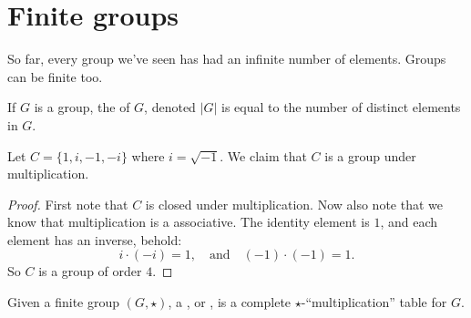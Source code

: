 \documentclass{ximera}
\begin{document}
\section{Finite groups}


So far, every group we've seen has had an infinite number of
elements. Groups can be finite too.

\begin{definition}
  If $G$ is a group, the  of $G$, denoted $|G|$ is equal to
  the number of distinct elements in $G$.
\end{definition}


\begin{example}\label{E:C}
  Let $C = \{1,i,-1,-i\}$ where $i =\sqrt{-1}$. We claim that $C$ is a
  group under multiplication.
  \begin{proof}
    First note that $C$ is closed under multiplication. Now also note
    that we know that multiplication is a associative. The identity
    element is $1$, and each element has an inverse, behold:
    \[
    i\cdot (-i) = 1, \quad\text{and}\quad (-1)\cdot(-1) = 1.
    \]
    So $C$ is a group of order $4$.
  \end{proof}
\end{example}


\begin{definition}
  Given a finite group $(G,\star)$, a , or
  , is a complete $\star$-``multiplication'' table
  for $G$.
\end{definition}
\end{document}
